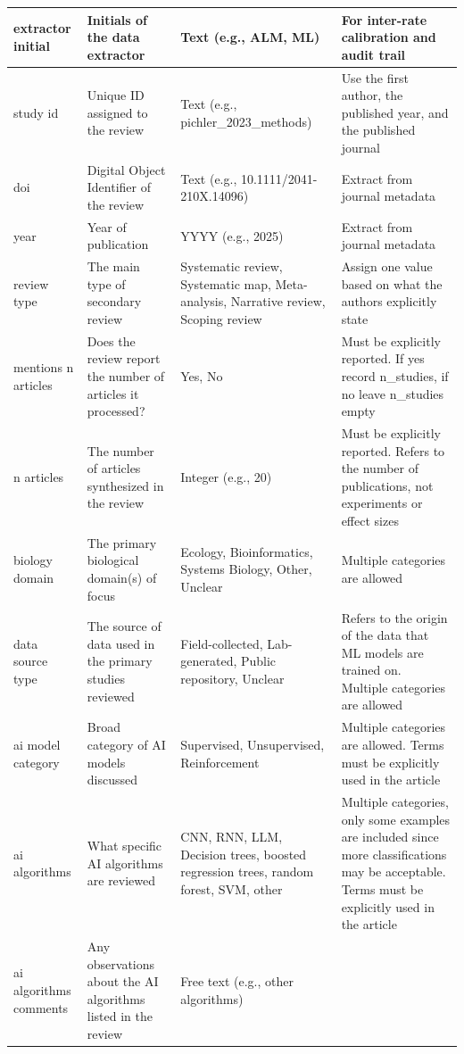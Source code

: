 \documentclass{article}
\begin{document}
\begin{longtable}{p{1.5cm}|p{3cm}|p{3cm}|p{3cm}}
        extractor initial & Initials of the data extractor & Text (e.g., ALM, ML) & For inter-rate calibration and audit trail\\
        \hline
        study id & Unique ID assigned to the review & Text (e.g., pichler\_2023\_methods) & Use the first author, the published year, and the published journal\\
        \hline
        doi & Digital Object Identifier of the review & Text (e.g., 10.1111/2041-210X.14096) & Extract from journal metadata\\
        \hline
        year & Year of publication & YYYY (e.g., 2025) & Extract from journal metadata\\
        \hline
        review type & The main type of secondary review & Systematic review, Systematic map, Meta-analysis, Narrative review, Scoping review & Assign one value based on what the authors explicitly state\\
        \hline
        mentions n articles & Does the review report the number of articles it processed? & Yes, No & Must be explicitly reported. If yes record n\_studies, if no leave n\_studies empty\\
        \hline
        n articles & The number of articles synthesized in the review & Integer (e.g., 20) & Must be explicitly reported. Refers to the number of publications, not experiments or effect sizes\\
        \hline
        biology domain & The primary biological domain(s) of focus & Ecology, Bioinformatics, Systems Biology, Other, Unclear & Multiple categories are allowed\\
        \hline
        data source type & The source of data used in the primary studies reviewed & Field-collected, Lab-generated, Public repository, Unclear & Refers to the origin of the data that ML models are trained on. Multiple categories are allowed\\
        \hline
        ai model category & Broad category of AI models discussed & Supervised, Unsupervised, Reinforcement & Multiple categories are allowed. Terms must be explicitly used in the article\\
        \hline
        ai algorithms & What specific AI algorithms are reviewed & CNN, RNN, LLM, Decision trees, boosted regression trees, random forest, SVM, other & Multiple categories, only some examples are included since more classifications may be acceptable. Terms must be explicitly used in the article\\
        \hline
        ai algorithms comments & Any observations about the AI algorithms listed in the review & Free text (e.g., other algorithms) & \\

\end{longtable}
\end{document}

